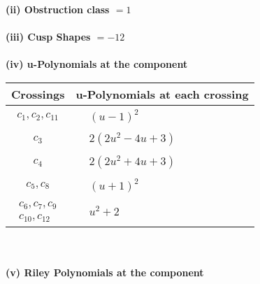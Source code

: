 \documentclass[1p]{elsarticle_modified}
\theoremstyle{definition}
\begin{document}
\flushleft \textbf{(ii) Obstruction class $= 1$}\\~\\
\flushleft \textbf{(iii) Cusp Shapes $= -12$}\\~\\
\newpage\renewcommand{\arraystretch}{1}
\flushleft \textbf{(iv) u-Polynomials at the component}\newline \\
\begin{tabular}{m{50pt}|m{274pt}}
Crossings & \hspace{64pt}u-Polynomials at each crossing \\
\hline $$\begin{aligned}c_{1},c_{2},c_{11}\end{aligned}$$&$\begin{aligned}
&(u-1)^2
\end{aligned}$\\
\hline $$\begin{aligned}c_{3}\end{aligned}$$&$\begin{aligned}
&2(2 u^2-4 u+3)
\end{aligned}$\\
\hline $$\begin{aligned}c_{4}\end{aligned}$$&$\begin{aligned}
&2(2 u^2+4 u+3)
\end{aligned}$\\
\hline $$\begin{aligned}c_{5},c_{8}\end{aligned}$$&$\begin{aligned}
&(u+1)^2
\end{aligned}$\\
\hline $$\begin{aligned}c_{6},c_{7},c_{9}\\c_{10},c_{12}\end{aligned}$$&$\begin{aligned}
&u^2+2
\end{aligned}$\\
\hline
\end{tabular}\\~\\
\newpage\renewcommand{\arraystretch}{1}
\flushleft \textbf{(v) Riley Polynomials at the component}\newline \\
\end{document}
